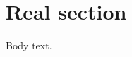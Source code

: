 \documentclass{article}
\begin{document}
\tableofcontents
{}
\section{Real section}
Body text.
\end{document}
